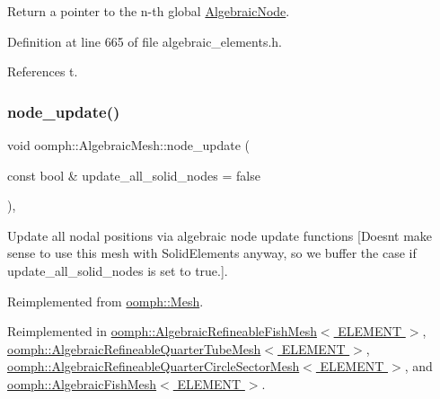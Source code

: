 Return a pointer to the n-\/th global \hyperlink{classoomph_1_1AlgebraicNode}{Algebraic\+Node}. 



Definition at line 665 of file algebraic\+\_\+elements.\+h.



References t.

\mbox{\label{classoomph_1_1AlgebraicMesh_ad3a5638cacb6df1a47c475bb177b6ed7}} 
\subsubsection{\texorpdfstring{node\+\_\+update()}{node\_update()}}
{\footnotesize\ttfamily void oomph\+::\+Algebraic\+Mesh\+::node\+\_\+update (\begin{DoxyParamCaption}\item[{const bool \&}]{update\+\_\+all\+\_\+solid\+\_\+nodes = {\ttfamily false} }\end{DoxyParamCaption})\hspace{0.3cm}{\ttfamily [inline]}, {\ttfamily [virtual]}}



Update all nodal positions via algebraic node update functions \mbox{[}Doesn\textquotesingle{}t make sense to use this mesh with Solid\+Elements anyway, so we buffer the case if update\+\_\+all\+\_\+solid\+\_\+nodes is set to true.\mbox{]}. 



Reimplemented from \hyperlink{classoomph_1_1Mesh_a95bf112e5e1b3892e70a41f91b3cc523}{oomph\+::\+Mesh}.



Reimplemented in \hyperlink{classoomph_1_1AlgebraicRefineableFishMesh_a8123da4b48355b39f19e0494a9d4545c}{oomph\+::\+Algebraic\+Refineable\+Fish\+Mesh$<$ E\+L\+E\+M\+E\+N\+T $>$}, \hyperlink{classoomph_1_1AlgebraicRefineableQuarterTubeMesh_af521c0a76cf0bd14692979bd7747507d}{oomph\+::\+Algebraic\+Refineable\+Quarter\+Tube\+Mesh$<$ E\+L\+E\+M\+E\+N\+T $>$}, \hyperlink{classoomph_1_1AlgebraicRefineableQuarterCircleSectorMesh_a32a096b894031167a90bafdab167ffc7}{oomph\+::\+Algebraic\+Refineable\+Quarter\+Circle\+Sector\+Mesh$<$ E\+L\+E\+M\+E\+N\+T $>$}, and \hyperlink{classoomph_1_1AlgebraicFishMesh_a39cd5a86b0f762efd09f4fefba6da1c3}{oomph\+::\+Algebraic\+Fish\+Mesh$<$ E\+L\+E\+M\+E\+N\+T $>$}.



